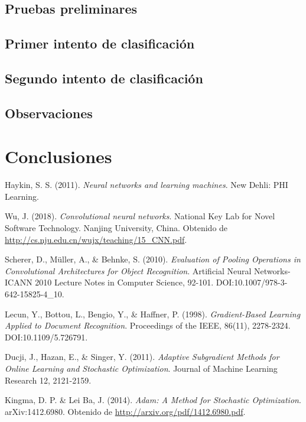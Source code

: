 \documentclass[spanish,11pt,letterpaper]{article}
\begin{document}
\subsection{Pruebas preliminares}

\subsection{Primer intento de clasificación}

\subsection{Segundo intento de clasificación}

\subsection{Observaciones}

\section{Conclusiones}

\begin{thebibliography}{9}
Haykin, S. S. (2011).
\textit{Neural networks and learning machines}.
New Dehli: PHI Learning.

Wu, J. (2018).
\textit{Convolutional neural networks}.
National Key Lab for Novel Software Technology. Nanjing University, China.
Obtenido de \url{http://cs.nju.edu.cn/wujx/teaching/15_CNN.pdf}.

Scherer, D., M\"uller, A., \& Behnke, S. (2010).
\textit{Evaluation of Pooling Operations in Convolutional Architectures for Object Recognition}.
Artificial Neural Networks-ICANN 2010 Lecture Notes in Computer Science, 92-101. DOI:10.1007/978-3-642-15825-4\_10.

Lecun, Y., Bottou, L., Bengio, Y., \& Haffner, P. (1998).
\textit{Gradient-Based Learning Applied to Document Recognition}.
Proceedings of the IEEE, 86(11), 2278-2324. DOI:10.1109/5.726791.

Ducji, J., Hazan, E., \& Singer, Y. (2011).
\textit{Adaptive Subgradient Methods for Online Learning and Stochastic Optimization}.
Journal of Machine Learning Research 12, 2121-2159.

Kingma, D. P. \& Lei Ba, J. (2014).
\textit{Adam: A Method for Stochastic Optimization}.
arXiv:1412.6980. Obtenido de \url{http://arxiv.org/pdf/1412.6980.pdf}.

\end{thebibliography}
\end{document}

